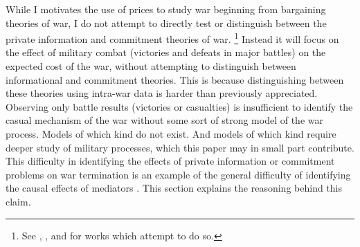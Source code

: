 While I motivates the use of prices to study war beginning from bargaining theories of war, I do not attempt to directly test or distinguish between the private information and commitment theories of war.%
\footnote{See \textcite{Ramsay2008}, \textcite{Weisiger2015}, and \textcite{Reiter2009} for works which attempt to do so.}
Instead it will focus on the effect of military combat (victories and defeats in major battles) on the expected cost of the war, without attempting to distinguish between informational and commitment theories.
This is because distinguishing between these theories using intra-war data is harder than previously appreciated.
Observing only battle results (victories or casualties) is insufficient to identify the casual mechanism of the war without some sort of strong model of the war process.
Models of which kind do not exist.
And models of which kind require deeper study of military processes, which this paper may in small part contribute.
This difficulty in identifying the effects of private information or commitment problems on war termination is an example of the general difficulty of identifying the causal effects of mediators \parencite{Keele2015a}.
This section explains the reasoning behind this claim.

